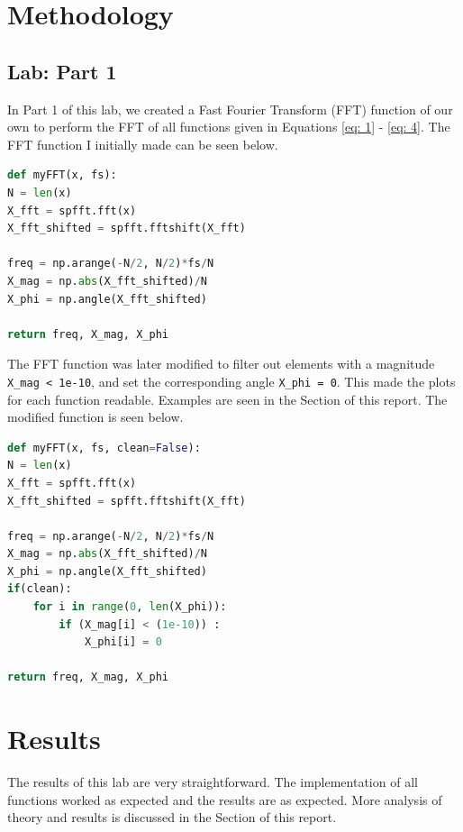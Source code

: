 \documentclass[12pt]{report}
\begin{document}
\section{Methodology}
\subsection{Lab: Part 1}\label{Section: Part1}
In Part 1 of this lab, we created a Fast Fourier Transform (FFT) function of our own to perform the FFT of all functions given in Equations \eqref{eq: 1} - \eqref{eq: 4}.
The FFT function I initially made can be seen below.

\begin{lstlisting}[language=Python, basicstyle=\footnotesize]
def myFFT(x, fs):
N = len(x)
X_fft = spfft.fft(x)
X_fft_shifted = spfft.fftshift(X_fft)

freq = np.arange(-N/2, N/2)*fs/N
X_mag = np.abs(X_fft_shifted)/N
X_phi = np.angle(X_fft_shifted)

return freq, X_mag, X_phi
\end{lstlisting}

The FFT function was later modified to filter out elements with a magnitude \texttt{X\_mag < 1e-10}, and set the corresponding angle \texttt{X\_phi = 0}. This made the plots
for each function readable. Examples are seen in the  Section of this report. The modified function is seen below. 

\begin{lstlisting}[language=Python, basicstyle=\footnotesize]
def myFFT(x, fs, clean=False):
N = len(x)
X_fft = spfft.fft(x)
X_fft_shifted = spfft.fftshift(X_fft)

freq = np.arange(-N/2, N/2)*fs/N
X_mag = np.abs(X_fft_shifted)/N
X_phi = np.angle(X_fft_shifted)
if(clean):
    for i in range(0, len(X_phi)):
        if (X_mag[i] < (1e-10)) :
            X_phi[i] = 0
    
return freq, X_mag, X_phi
\end{lstlisting}

\section{Results}\label{section: Results}
The results of this lab are very straightforward. The implementation of all functions worked as expected and the results are as expected.
More analysis of theory and results is discussed in the  Section of this report.
\end{document}
